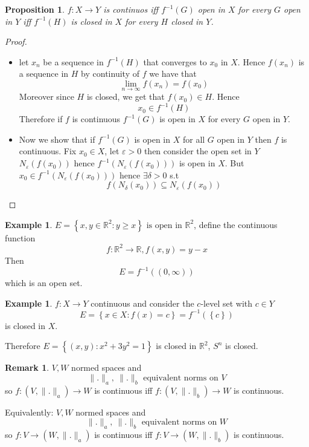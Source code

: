 \documentclass[11pt,a4paper]{article}
\theoremstyle{definition}
\newtheorem{example}[definition]{Example}
\newtheorem{remark}[definition]{Remark}
\theoremstyle{plain}
\newtheorem{proposition}[definition]{Proposition}
\theoremstyle{remark}
\newcommand{\R}{\mathbb{R}}
\renewcommand{\set}[1]{\left\{ #1 \right\}}
\newcommand{\norm}[1]{\lVert #1 \rVert}
\begin{document}
\begin{proposition}
    $f \colon X \to Y$ is continuos iff $f^{-1}(G)$ open in $X$ for every $G$ open in $Y$ iff $f^{-1} (H)$ is closed in $X$ 
    for every $H$ closed in $Y$. 
\end{proposition}

\begin{proof}
    \begin{itemize}
        \item[$\implies$] let $x_n$ be a sequence in $f^{-1}(H)$ that converges to $x_0$ in $X$. Hence 
        $f(x_n)$ is a sequence in $H$ by continuity of $f$ we have that 
        $$\lim_{n \to \infty} f(x_n) = f(x_0)$$
        Moreover since $H$ is closed, we get that $f(x_0) \in H$. Hence 
        $$x_0 \in f^{-1}(H)$$ 
        Therefore if $f$ is continuous $f^{-1} (G)$ is open in $X$ for every $G$ open in $Y$. 

        \item[$\impliedby$] Now we show that if $f^{-1}(G)$ is open in $X$ for all $G$ open in $Y$ then $f$ is continuous. Fix $x_0 \in X$, 
        let $\varepsilon > 0$ then consider the open set in $Y$ $N_\varepsilon (f(x_0))$ hence $f^{-1} \left(N_\varepsilon(f(x_0))\right)$ is open 
        in $X$. But $x_0 \in  f^{-1} \left(N_\varepsilon(f(x_0))\right)$ hence $\exists \delta > 0$ s.t 
        $$f \left(N_\delta(x_0)\right) \subseteq N_\varepsilon(f(x_0))$$
    \end{itemize}
\end{proof}

\begin{example}
    $E = \set{x,y \in \R^2 \colon y \ge x} \text{ is open in $\R^2$}$, define the continuous function
    $$f \colon \R^2 \to \R, f(x,y) = y - x$$
    Then 
    $$E = f^{-1} \left((0, \infty)\right)$$
    which is an open set. 
\end{example}

\begin{example}
    $f \colon X \to Y$ continuous and consider the $c$-level set with $c \in Y$
    $$E = \set{x \in X \colon f(x) = c} = f^{-1} \left(\set{c}\right)$$
    is closed in $X$. 

    Therefore $E = \set{(x,y) \colon x^2 + 3y^2 = 1}$ is closed in $\R^2$, $S^n$ is closed. 
\end{example}

\begin{remark}
    $V, W$ normed spaces and 
    $$\norm{.}_a, \ \norm{.}_b \text{ equivalent norms on $V$}$$
    so $f \colon (V, \norm{.}_a) \to W$ is continuous iff 
    $f \colon (V, \norm{.}_b) \to W$ is continuous. 

    Equivalently: $V, W$ normed spaces and 
    $$\norm{.}_a, \ \norm{.}_b \text{ equivalent norms on $W$}$$
    so $f \colon V \to (W, \norm{.}_a)$ is continuous iff 
    $f \colon V \to (W, \norm{.}_b)$ is continuous. 
\end{remark}
\end{document}
